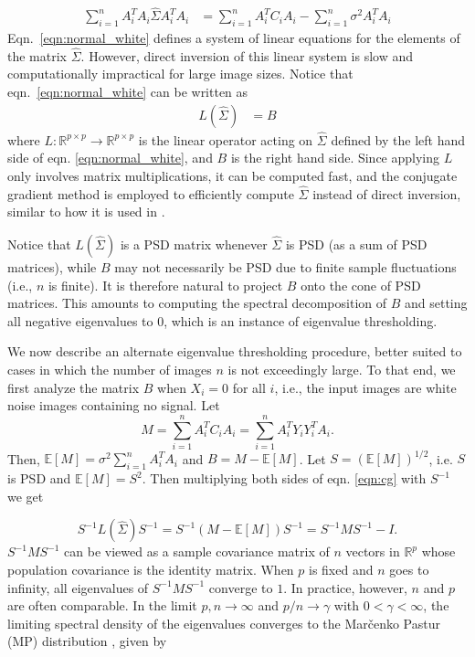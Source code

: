 \documentclass[review]{elsarticle}
\begin{document}
\begin{equation}
\begin{aligned}
\sum_{i=1}^n  A_i^T  A_i \hat \Sigma A_i^T A_i
&= \sum_{i=1}^n A_i^T C_i A_i - \sum_{i=1}^n \sigma^2 A_i^T A_i 
\end{aligned}
\label{eqn:normal_white}
\end{equation}
Eqn.\ \ref{eqn:normal_white} defines a system of linear equations for the elements of the matrix $\hat \Sigma$.
However, direct inversion of this linear system is slow and computationally impractical for large image sizes.
Notice that eqn.\ \ref{eqn:normal_white} can be written as 
\begin{equation}
\begin{aligned}
L(\hat\Sigma) 
&=  B 
\label{eqn:cg}
\end{aligned}
\end{equation}
where $L:\mathbb{R}^{p\times p} \to \mathbb{R}^{p\times p}$ is the linear operator acting on $\hat{\Sigma}$ defined by the left hand side of eqn. \ref{eqn:normal_white}, and $B$ is the right hand side.
Since applying $L$ only involves matrix multiplications, it can be computed fast, and
the conjugate gradient method is employed to efficiently compute $\hat \Sigma$ instead of direct inversion,
similar to how it is used in \cite{joakim}.

Notice that $L(\hat{\Sigma})$ is a PSD matrix whenever $\hat{\Sigma}$ is PSD (as 
a sum of PSD matrices), while $B$ may not necessarily be PSD due to finite 
sample fluctuations (i.e., $n$ is finite). It is therefore natural to project 
$B$ onto the cone of PSD matrices. This amounts to computing the spectral 
decomposition of $B$ and setting all negative eigenvalues to 0, which is an 
instance of eigenvalue thresholding.

We now describe an alternate eigenvalue thresholding procedure, better suited to 
cases in which the number of images $n$ is not exceedingly large. To that end, 
we first analyze the matrix $B$ when $X_i=0$ for all $i$, i.e., the input images 
are white noise images containing no signal. Let 
\begin{equation}
M = \sum_{i=1}^n A_i^T C_i A_i = \sum_{i=1}^n A_i^T Y_i Y_i^T A_i.
\end{equation}
Then, $\mathbb{E}[M] = \sigma^2 \sum_{i=1}^n A_i^T A_i$
and $B = M - \mathbb{E}[M]$. Let $S = (\mathbb{E}[M])^{1/2}$, i.e. 
$S$ is PSD and $\mathbb{E}[M]=S^2$.
Then multiplying both sides of eqn. \ref{eqn:cg} with $S^{-1}$ we get

\begin{equation}
 S^{-1} L(\hat\Sigma)  S^{-1} = S^{-1}(M - \mathbb{E}[M]) S^{-1} = S^{-1} M S^{-1} - I .
\label{eqn:pop1}
\end{equation}
$S^{-1}MS^{-1}$ can be viewed as a sample covariance matrix of
$n$ vectors in $ \mathbb{R}^p$ whose population covariance is the identity matrix.
When $p$ is fixed and $n$ goes to infinity, all eigenvalues of $S^{-1}MS^{-1}$ converge to $1$.
In practice, however, $n$ and $p$ are often comparable. In the limit $p, n \to 
\infty$ and $p/n \to \gamma$ with $0 < \gamma < \infty$, the limiting spectral 
density of the eigenvalues converges to the Mar\v{c}enko Pastur (MP) distribution \cite{marcenko},
given by
\end{document}

